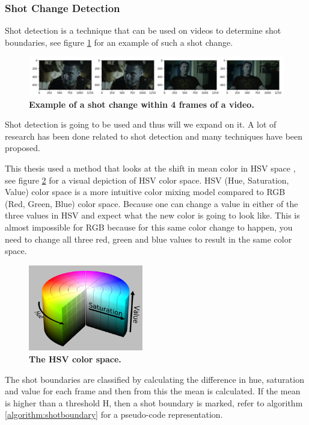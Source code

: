 \documentclass{article}
\begin{document}
\subsubsection{Shot Change Detection}

Shot detection is a technique that can be used on videos to determine shot boundaries, see figure \ref{shotchange} for an example of such a shot change. 

\begin{figure}[H]
	\includegraphics[width=12cm]{images/shotchange.jpg}
	\centering
	\caption{\textbf{Example of a shot change within 4 frames of a video.}}
	\label{shotchange}
\end{figure}

Shot detection is going to be used and thus will we expand on it. A lot of research has been done related to shot detection \cite{lienhart1998comparison} and many techniques have been proposed. 

This thesis used a method that looks at the shift in mean color in HSV space \cite{shao2015shot}, see figure \ref{hsvspace} for a visual depiction of HSV color space. HSV (Hue, Saturation, Value) color space is a more intuitive color mixing model compared to RGB (Red, Green, Blue) color space. Because one can change a value in either of the three values in HSV and expect what the new color is going to look like. This is almost impossible for RGB because for this same color change to happen, you need to change all three red, green and blue values to result in the same color space.

\begin{figure}[H]
	\includegraphics[width=5cm]{images/hsv.png}
	\centering
	\caption{\textbf{The HSV color space.}}
	\label{hsvspace}
\end{figure}

The shot boundaries are classified by calculating the difference in hue, saturation and value for each frame and then from this the mean is calculated. If the mean is higher than a threshold H, then a shot boundary is marked, refer to algorithm \ref{algorithm:shotboundary} for a pseudo-code representation.
\end{document}
